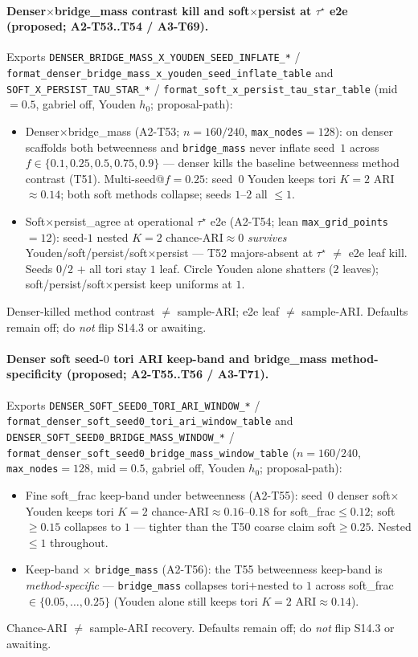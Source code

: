 \documentclass[11pt]{article}
\begin{document}
\paragraph{Denser$\times$bridge\_mass contrast kill and soft$\times$persist
at $\tau^\star$ e2e (proposed; A2-T53..T54 / A3-T69).}
Exports
\texttt{DENSER\_BRIDGE\_MASS\_X\_YOUDEN\_SEED\_INFLATE\_*} /
\texttt{format\_denser\_bridge\_mass\_x\_youden\_seed\_inflate\_table} and
\texttt{SOFT\_X\_PERSIST\_TAU\_STAR\_*} /
\texttt{format\_soft\_x\_persist\_tau\_star\_table}
(mid${=}0.5$, gabriel off, Youden $h_0$; proposal-path):
\begin{itemize}[leftmargin=1.5em]
  \item Denser$\times$bridge\_mass (A2-T53; $n{=}160/240$,
  \texttt{max\_nodes}${=}128$): on denser scaffolds both betweenness and
  \texttt{bridge\_mass} never inflate seed~$1$ across
  $f\in\{0.1,0.25,0.5,0.75,0.9\}$ --- denser kills the baseline
  betweenness method contrast (T51). Multi-seed@$f{=}0.25$: seed~$0$
  Youden keeps tori $K{=}2$ ARI$\approx 0.14$; both soft methods
  collapse; seeds $1$--$2$ all $\le 1$.
  \item Soft$\times$persist\_agree at operational $\tau^\star$ e2e
  (A2-T54; lean \texttt{max\_grid\_points}${=}12$): seed-$1$ nested
  $K{=}2$ chance-ARI$\approx 0$ \emph{survives}
  Youden/soft/persist/soft$\times$persist --- T52 majors-absent at
  $\tau^\star$ $\neq$ e2e leaf kill. Seeds $0$/$2$ $+$ all tori stay $1$
  leaf. Circle Youden alone shatters ($2$ leaves);
  soft/persist/soft$\times$persist keep uniforms at $1$.
\end{itemize}
Denser-killed method contrast $\neq$ sample-ARI; e2e leaf $\neq$
sample-ARI. Defaults remain off; do \emph{not} flip S14.3 or awaiting.

\paragraph{Denser soft seed-$0$ tori ARI keep-band and bridge\_mass
method-specificity (proposed; A2-T55..T56 / A3-T71).}
Exports \texttt{DENSER\_SOFT\_SEED0\_TORI\_ARI\_WINDOW\_*} /
\texttt{format\_denser\_soft\_seed0\_tori\_ari\_window\_table} and
\texttt{DENSER\_SOFT\_SEED0\_BRIDGE\_MASS\_WINDOW\_*} /
\texttt{format\_denser\_soft\_seed0\_bridge\_mass\_window\_table}
($n{=}160/240$, \texttt{max\_nodes}${=}128$, mid${=}0.5$, gabriel off,
Youden $h_0$; proposal-path):
\begin{itemize}[leftmargin=1.5em]
  \item Fine soft\_frac keep-band under betweenness (A2-T55): seed~$0$
  denser soft$\times$Youden keeps tori $K{=}2$ chance-ARI$\approx 0.16$--$0.18$
  for soft\_frac$\le 0.12$; soft$\ge 0.15$ collapses to $1$ --- tighter
  than the T50 coarse claim soft$\ge 0.25$. Nested $\le 1$ throughout.
  \item Keep-band $\times$ \texttt{bridge\_mass} (A2-T56): the T55
  betweenness keep-band is \emph{method-specific} ---
  \texttt{bridge\_mass} collapses tori$+$nested to $1$ across
  soft\_frac$\in\{0.05,\ldots,0.25\}$ (Youden alone still keeps tori
  $K{=}2$ ARI$\approx 0.14$).
\end{itemize}
Chance-ARI $\neq$ sample-ARI recovery. Defaults remain off; do \emph{not}
flip S14.3 or awaiting.
\end{document}
